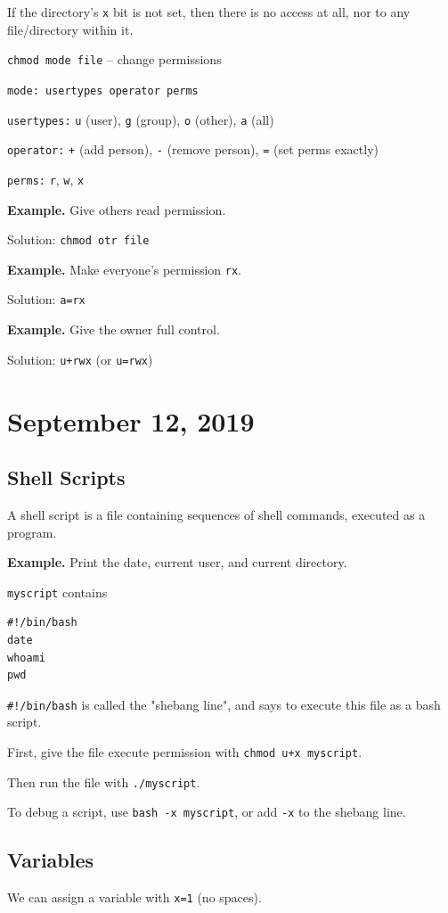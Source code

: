 \documentclass[11pt]{article}
\theoremstyle{definition}
\begin{document}
If the directory's {\tt x} bit is not set, then there is no access at all, nor to any file/directory within it.

{\tt chmod mode file} -- change permissions

{\tt mode: usertypes operator perms}

{\tt usertypes:} {\tt u} (user), {\tt g} (group), {\tt o} (other), {\tt a} (all)

{\tt operator:} {\tt +} (add person), {\tt -} (remove person), {\tt =} (set perms exactly)

{\tt perms:} {\tt r}, {\tt w}, {\tt x}

{\bf Example.} Give others read permission.

Solution: {\tt chmod otr file}

{\bf Example.} Make everyone's permission {\tt rx}.

Solution: {\tt a=rx}

{\bf Example.} Give the owner full control.

Solution: {\tt u+rwx} (or {\tt u=rwx})
\newpage
\section{September 12, 2019}
\subsection{Shell Scripts}
A shell script is a file containing sequences of shell commands, executed as a program. 

{\bf Example.} Print the date, current user, and current directory.

{\tt myscript} contains

\begin{verbatim}
#!/bin/bash
date
whoami
pwd
\end{verbatim}

{\tt \#!/bin/bash} is called the "shebang line", and says to execute this file as a bash script.

First, give the file execute permission with {\tt chmod u+x myscript}.

Then run the file with {\tt ./myscript}.

To debug a script, use {\tt bash -x myscript}, or add {\tt -x} to the shebang line.

\subsection{Variables}
We can assign a variable with {\tt x=1} (no spaces). 
\end{document}
